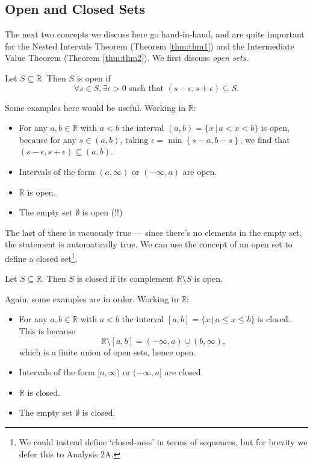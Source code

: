 \documentclass[
  17pt,
  a4paper]{extarticle}
\providecommand{\tightlist}{%
  \setlength{\itemsep}{0pt}\setlength{\parskip}{0pt}}
\theoremstyle{plain}
\theoremstyle{plain}
\theoremstyle{plain}
\theoremstyle{plain}
\theoremstyle{plain}
\theoremstyle{definition}
\theoremstyle{definition}
\theoremstyle{definition}
\theoremstyle{remark}
\let\BeginKnitrBlock\begin \let\EndKnitrBlock\end
\renewcommand{\;}{\,}
\begin{document}
\hypertarget{open-and-closed-sets}{%
\subsection{Open and Closed Sets}\label{open-and-closed-sets}}

The next two concepts we discuss here go hand-in-hand, and are quite important for the Nested Intervals Theorem (Theorem \ref{thm:thm1}) and the Intermediate Value Theorem (Theorem \ref{thm:thm2}). We first discuss \emph{open sets}.

\BeginKnitrBlock{definition}[Open Set]
{\label{def:def4} }Let \(S \subseteq \mathbb{R}\). Then \(S\) is open if \[\forall s \in S, \exists \epsilon > 0 \;\; \text{such that} \;\; (s-\epsilon,s+\epsilon) \subseteq S.\]
\EndKnitrBlock{definition}
Some examples here would be useful. Working in \(\mathbb{R}\):

\begin{itemize}
\tightlist
\item
  For any \(a,b \in \mathbb{R}\) with \(a < b\) the interval \((a,b) = \lbrace x \;\lvert\; a < x < b \rbrace\) is open, because for any \(s \in (a,b)\), taking \(\epsilon = \min\left\lbrace s-a, b-s\right\rbrace\), we find that \((s-\epsilon, s + \epsilon) \subseteq (a,b)\).
\item
  Intervals of the form \((a, \infty)\) or \((-\infty, a)\) are open.
\item
  \(\mathbb{R}\) is open.
\item
  The empty set \(\emptyset\) is open (!!)
\end{itemize}

The last of these is vacuously true --- since there's no elements in the empty set, the statement is automatically true. We can use the concept of an open set to define a closed set\footnote{We could instead define `closed-ness' in terms of sequences, but for brevity we defer this to Analysis 2A.}.

\BeginKnitrBlock{definition}[Closed Set]
{\label{def:def5} }Let \(S \subseteq \mathbb{R}\). Then \(S\) is closed if its complement \(\mathbb{R}\setminus S\) is open.
\EndKnitrBlock{definition}
Again, some examples are in order. Working in \(\mathbb{R}\):

\begin{itemize}
\tightlist
\item
  For any \(a,b \in \mathbb{R}\) with \(a < b\) the interval \([a,b] = \lbrace x \;\lvert\; a \leq x \leq b \rbrace\) is closed. This is because \[\mathbb{R}\setminus[a,b] = (-\infty,a)\cup(b,\infty),\] which is a finite union of open sets, hence open.
\item
  Intervals of the form \([a, \infty)\) or \((-\infty, a]\) are closed.
\item
  \(\mathbb{R}\) is closed.
\item
  The empty set \(\emptyset\) is closed.
\end{itemize}
\end{document}
